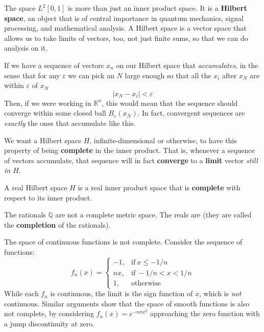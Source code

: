 \documentclass[../master.tex]{subfiles}
\begin{document}
	The space $L^2[0,1]$ is more than just an inner product space. It is a \textbf{Hilbert space}, an object that is of central importance in quantum mechanics, signal processing, and mathematical analysis. A Hilbert space is a vector space that allows us to take limits of vectors, too, not just finite sums, so that we can do analysis on it.
	
	If we have a sequence of vectors $x_n$ on our Hilbert space that \emph{accumulates}, in the sense that for any $\varepsilon$ we can pick an $N$ large enough so that all the $x_i$ after $x_N$ are within $\varepsilon$ of $x_N$
	\begin{equation}
		|x_N - x_i| < \varepsilon
	\end{equation}
	Then, if we were working in $\mathbb R^n$, this would mean that the sequence should converge within some closed ball $B_{\varepsilon}(x_N)$. In fact, convergent sequences are \emph{exactly} the ones that accumulate like this. 
	
	We want a Hilbert space $H$, infinite-dimensional or otherwise, to have this property of being \textbf{complete} in the inner product. That is, whenever a sequence of vectors accumulate, that sequence will in fact \textbf{converge} to a \textbf{limit} vector \emph{still in $H$}.
	
	\begin{defn}
		A real Hilbert space $H$ is a real inner product space that is \textbf{complete} with respect to its inner product. 
	\end{defn}
	\begin{example}
		The rationals $\mathbb Q$ are not a complete metric space. The reals are (they are called the \textbf{completion} of the rationals). 
	\end{example}
	\begin{example}
		The space of continuous functions is not complete. Consider the sequence of functions:
		\begin{equation}
			f_n(x) = \begin{cases}
    -1 ,& \mathrm{if} ~ x \leq  -1/n \\
    n x,  &\mathrm{if} ~ -1/n < x < 1/n \\
	1, & \mathrm{otherwise}
\end{cases}
		\end{equation}
		While each $f_n$ is continuous, the limit is the sign function of $x$, which is \emph{not} continuous. Similar arguments show that the space of smooth functions is also not complete, by considering $f_n (x) = e^{-n \pi x^2}$ approaching the zero function with a jump discontinuity at zero. 
	\end{example}
	
\end{document}
